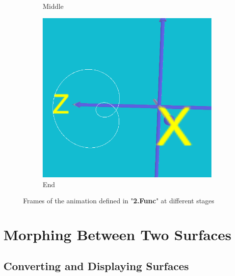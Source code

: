 \documentclass[acmlarge,nonacm=true]{acmart}
\begin{document}
\begin{figure}[H]
\begin{subfigure}{.33\textwidth}
	  \caption{Middle}
	\end{subfigure}
	\begin{subfigure}{.33\textwidth}
		\centering
		\includegraphics[width=.8\linewidth]{fig/2_end}
		\caption{End}
	  \end{subfigure}
	\caption{Frames of the animation defined in "\textbf{2.Func}" at different stages}
	\label{fig:2}
\end{figure}


\pagebreak

\section{Morphing Between Two Surfaces}
\subsection{Converting and Displaying Surfaces}
\end{document}
